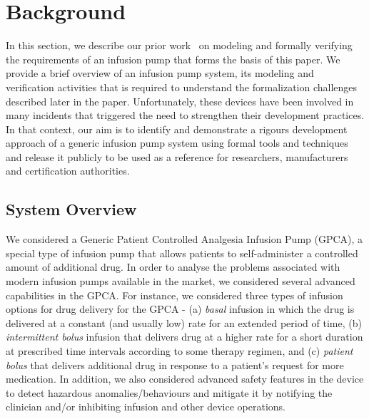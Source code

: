 \section{Background}
\label{sec:gpca-overview}

In this section, we describe our prior work~\cite{hilt2013, req2code} on modeling and formally verifying the requirements of an infusion pump that forms the basis of this paper. We provide a brief overview of an infusion pump system, its modeling and verification activities that is required to understand the formalization challenges described later in the paper. Unfortunately, these devices have been involved in many incidents that triggered the need to strengthen their development practices. In that context, our aim is to identify and demonstrate a rigours development approach of a generic infusion pump system using formal tools and techniques and release it publicly to be used as a reference for researchers, manufacturers and certification authorities.

\subsection {System Overview}
We considered a Generic Patient Controlled Analgesia Infusion Pump (GPCA), a special type of infusion pump that allows patients to self-administer a controlled amount of additional drug. %
In order to analyse the problems associated with modern infusion pumps available in the market, we considered several advanced capabilities in the GPCA. For instance, we considered three types of infusion options for drug delivery for the GPCA - (a) \emph{basal} infusion in which the drug is delivered at a constant (and usually low) rate for an extended period of
time, (b) \emph{intermittent bolus} infusion that delivers drug at a higher rate for a short duration at prescribed time intervals according to some therapy regimen, and (c) \emph{patient bolus} that delivers additional drug in response to a patient's request for more medication. In addition, we also considered advanced safety features in the device to detect hazardous anomalies/behaviours and mitigate it by notifying the clinician and/or inhibiting infusion and other device operations.

